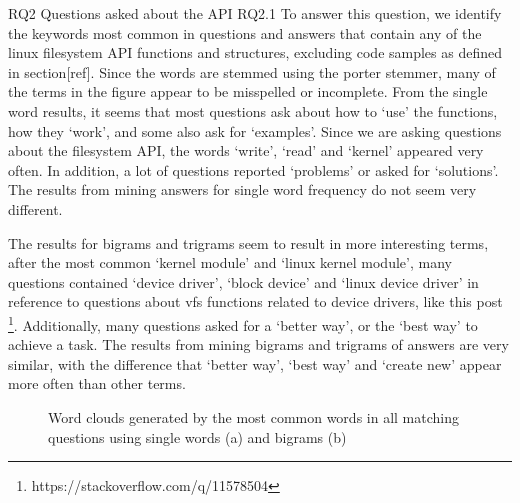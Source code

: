 RQ2
Questions asked about the API
RQ2.1
To answer this question, we identify the keywords most common in questions and answers that contain any of the linux filesystem API functions and structures, excluding code samples as defined in section[ref]. Since the words are stemmed using the porter stemmer, many of the terms in the figure appear to be misspelled or incomplete.
From the single word results, it seems that most questions ask about how to `use' the functions, how they `work', and some also ask for `examples'. Since we are asking questions about the filesystem API, the words `write', `read' and `kernel' appeared very often. In addition, a lot of questions reported `problems' or asked for `solutions'. The results from mining answers for single word frequency do not seem very different.

The results for bigrams and trigrams seem to result in more interesting terms, after the most common `kernel module' and `linux kernel module', many questions contained `device driver', `block device' and `linux device driver' in reference to questions about vfs functions related to device drivers, like this post \footnote{https://stackoverflow.com/q/11578504}. Additionally, many questions asked for a `better way', or the `best way' to achieve a task.
The results from mining bigrams and trigrams of answers are very similar, with the difference that `better way', `best way' and `create new' appear more often than other terms.

\begin{figure}[t!]
  \centering
  \qquad
  \caption{Word clouds generated by the most common words in all matching questions using single words (a) and bigrams (b)}
  \label{fig:wcall}
\end{figure}

